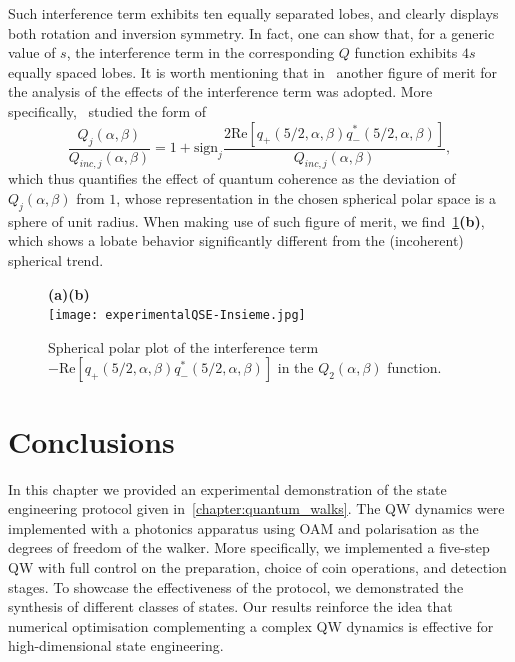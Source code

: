 Such interference term exhibits ten equally separated lobes, and clearly displays both rotation and inversion symmetry. In fact, one can show that, for a generic value of $s$, the interference term in the corresponding $Q$ function exhibits $4s$ equally spaced lobes. It is worth mentioning that in~\cite{agarwal1997atomic} another figure of merit for the analysis of the effects of the interference term was adopted. More specifically,~\cite{agarwal1997atomic} studied the form of 
\begin{equation}
\frac{Q_j(\alpha,\beta)}{Q_{inc,j}(\alpha,\beta)}=1+\text{sign}_j\frac{2\text{Re}[q_+(5/2,\alpha,\beta)q^*_-(5/2,\alpha,\beta)]}{Q_{inc,j}(\alpha,\beta)},
\end{equation}
which thus quantifies the effect of quantum coherence as the deviation of $Q_j(\alpha,\beta)$ from $1$, whose representation in the chosen spherical polar space is a sphere of unit radius. When making use of such figure of merit, we find~\cref{fig:expQWs:SCS_plots}\textbf{(b)}, which shows a lobate behavior significantly different from the (incoherent) spherical trend. 

\begin{figure}[tb]
    \centering
    {\bf (a)}\hskip8cm{\bf (b)}\\
    \texttt{[image: experimentalQSE-Insieme.jpg]}
    \caption{Spherical polar plot of the interference term $-\text{Re}[q_+(5/2,\alpha,\beta)q^*_-(5/2,\alpha,\beta)]$ in the $Q_2(\alpha,\beta)$ function.}
    \label{fig:expQWs:SCS_plots}
\end{figure}



\section{Conclusions}
\label{sec:expQWs:conclusions}

In this chapter we provided an experimental demonstration of the state engineering protocol given in~\cref{chapter:quantum_walks}. The QW dynamics were implemented with a photonics apparatus using \ac{OAM} and polarisation as the degrees of freedom of the walker.
More specifically, we implemented a five-step \ac{QW} with full control on the preparation, choice of coin operations, and detection stages. To showcase the effectiveness of the protocol, we demonstrated the synthesis of different classes of states.
Our results reinforce the idea that numerical optimisation complementing a complex \ac{QW} dynamics is effective for high-dimensional state engineering.
